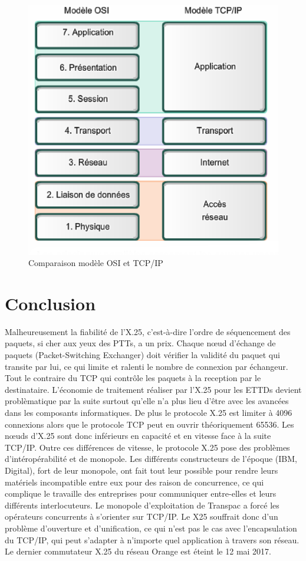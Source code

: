 \documentclass[12pt]{report}
\begin{document}
\begin{figure}[htp]
  \centering
  \includegraphics[scale=0.5]{images/osi-tcp-ip}
  \caption{Comparaison modèle OSI et TCP/IP}
  \label{fig:osi-tcp}
\end{figure}

\section{Conclusion}

Malheureusement la fiabilité de l'X.25, c'est-à-dire l'ordre de séquencement des paquets, si cher aux yeux des PTTs, a un prix.
Chaque nœud d'échange de paquets (Packet-Switching Exchanger) doit vérifier la validité du paquet qui
transite par lui, ce qui limite et ralenti le nombre de connexion par échangeur. Tout le contraire du TCP qui contrôle les paquets à la reception par le destinataire.
L'économie de traitement réaliser par l'X.25 pour les ETTDs devient problèmatique par la suite surtout qu'elle n'a plus lieu d'être avec les avancées dans les composants informatiques.
De plus le protocole X.25 est limiter à 4096 connexions alors que le protocole TCP peut en ouvrir théoriquement 65536. Les nœuds d'X.25 sont donc inférieurs en capacité et en vitesse face à la suite TCP/IP.
Outre ces différences de vitesse, le protocole X.25 pose des problèmes d'intéropérabilité et de monopole. Les différents constructeurs de l'époque (IBM, Digital), fort de leur monopole,
ont fait tout leur possible pour rendre leurs matériels incompatible entre eux pour des raison de concurrence, ce qui complique le travaille des entreprises pour
communiquer entre-elles et leurs différents interlocuteurs. Le monopole d'exploitation de Transpac a forcé les opérateurs concurrents à s'orienter sur TCP/IP.
Le X25 souffrait donc d'un problème d'ouverture et d'unification, ce qui n'est pas le cas avec l'encapsulation du TCP/IP,
qui peut s'adapter à n'importe quel application à travers son réseau. Le dernier commutateur X.25 du réseau Orange est éteint le 12 mai 2017\cite{killme}.
\end{document}
